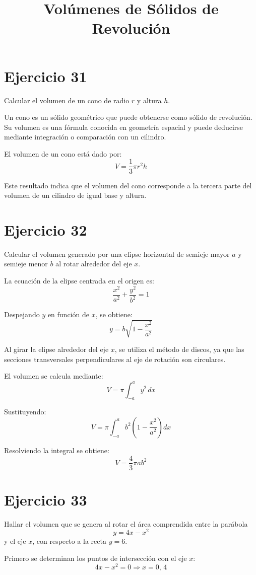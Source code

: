 \documentclass[12pt]{article}
\title{Volúmenes de Sólidos de Revolución}
\author{}
\date{}
\begin{document}
\maketitle

\section*{Ejercicio 31}
Calcular el volumen de un cono de radio $r$ y altura $h$.

Un cono es un sólido geométrico que puede obtenerse como sólido de revolución. Su volumen es una fórmula conocida en geometría espacial y puede deducirse mediante integración o comparación con un cilindro.

El volumen de un cono está dado por:
\[
V = \frac{1}{3}\pi r^2 h
\]

Este resultado indica que el volumen del cono corresponde a la tercera parte del volumen de un cilindro de igual base y altura.

\section*{Ejercicio 32}
Calcular el volumen generado por una elipse horizontal de semieje mayor $a$ y semieje menor $b$ al rotar alrededor del eje $x$.

La ecuación de la elipse centrada en el origen es:
\[
\frac{x^2}{a^2} + \frac{y^2}{b^2} = 1
\]

Despejando $y$ en función de $x$, se obtiene:
\[
y = b\sqrt{1 - \frac{x^2}{a^2}}
\]

Al girar la elipse alrededor del eje $x$, se utiliza el método de discos, ya que las secciones transversales perpendiculares al eje de rotación son circulares.

El volumen se calcula mediante:
\[
V = \pi \int_{-a}^{a} y^2 \, dx
\]

Sustituyendo:
\[
V = \pi \int_{-a}^{a} b^2 \left(1 - \frac{x^2}{a^2}\right) dx
\]

Resolviendo la integral se obtiene:
\[
V = \frac{4}{3}\pi a b^2
\]

\section*{Ejercicio 33}
Hallar el volumen que se genera al rotar el área comprendida entre la parábola
\[
y = 4x - x^2
\]
y el eje $x$, con respecto a la recta $y = 6$.

Primero se determinan los puntos de intersección con el eje $x$:
\[
4x - x^2 = 0 \Rightarrow x = 0, \, 4
\]
\end{document}

